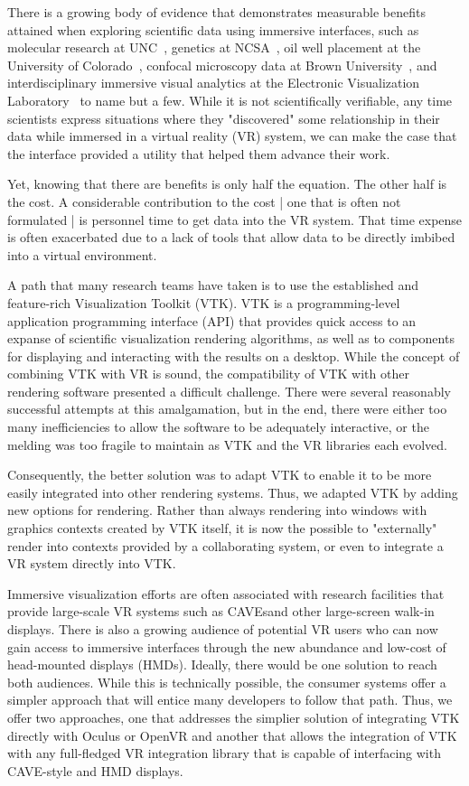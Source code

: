 There is a growing body of evidence that demonstrates measurable benefits
attained when exploring scientific data using immersive interfaces, such as
molecular research at UNC~\cite{Brooks:1990},
genetics at NCSA~\cite{Brady:1995},
oil well placement at the University of Colorado~\cite{Gruchalla:2004},  confocal microscopy data at Brown University~\cite{Prabhat:2008}, and interdisciplinary immersive visual analytics at the Electronic Visualization Laboratory~\cite{Marai:2016} to name but a few.
While it is not scientifically verifiable, any time scientists
express situations where they "discovered" some relationship in their data
while immersed in a virtual reality (VR) system, we can make the case that the
interface provided a utility that helped them advance their work.

Yet, knowing that there are benefits is only half the equation.
The other half is the cost.
A considerable contribution to the cost | one that is often not
formulated | is personnel time to get data into the VR system.
That time expense is often exacerbated due to a lack of tools that
allow data to be directly imbibed into a virtual environment.

A path that many research teams have taken is to use the established and
feature-rich Visualization Toolkit (VTK).
VTK is a programming-level application programming interface (API) that provides quick access to an expanse
of scientific visualization rendering algorithms, as well as to components
for displaying and interacting with the results on a desktop.
While the concept of combining VTK with VR is sound, the
compatibility of VTK with other rendering software presented a difficult
challenge.  
There were several reasonably successful attempts at this amalgamation,
but in the end, there were either too many inefficiencies to allow the
software to be adequately interactive, or the melding was too fragile to
maintain as VTK and the VR libraries each evolved.

Consequently, the better solution was to adapt VTK to enable it to be
more easily integrated into other rendering systems.
Thus, we adapted VTK by adding new options for rendering.
Rather than always rendering into windows with graphics contexts
created by VTK itself, it is now the possible to "externally" render
into contexts provided by a collaborating system, or even to integrate a
VR system directly into VTK.

Immersive visualization efforts are often associated with research
facilities that provide large-scale VR systems such as CAVEs\texttrademark and
other large-screen walk-in displays.
There is also a growing audience of potential VR users who can now
gain access to immersive interfaces through the new abundance and low-cost
of head-mounted displays (HMDs).
Ideally, there would be one solution to reach both audiences. While this is
technically possible, the consumer systems offer a simpler
approach that will entice many developers to follow that path.
Thus, we offer two approaches, one that addresses the simplier solution
of integrating VTK directly with Oculus or OpenVR and another that allows the integration of VTK with
any full-fledged VR integration library that is capable of interfacing
with CAVE-style and HMD displays.


